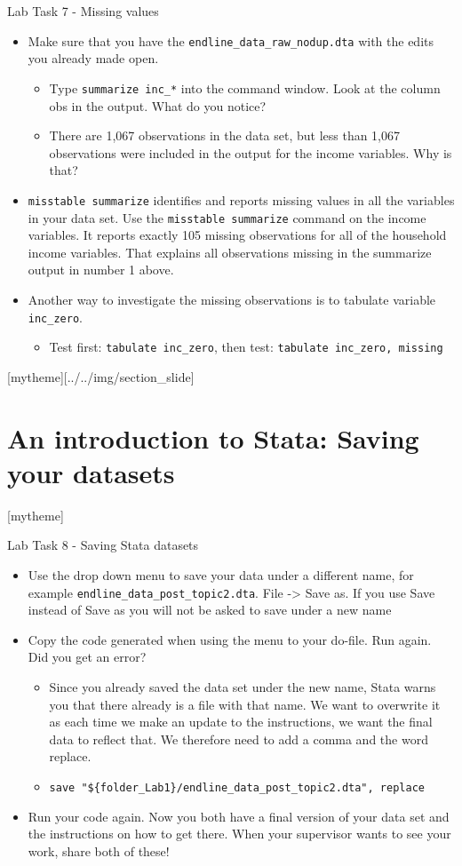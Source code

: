 \documentclass[aspectratio=169]{beamer}
\newcommand{\sectionpic}[2]{
	\setbeamertemplate{section page}[mytheme][#2]
	\section{#1}
	\setbeamertemplate{section page}[mytheme]
}
\begin{document}
\begin{frame}{Lab Task 7 - Missing values}
	\begin{itemize}
		\item Make sure that you have the \texttt{endline\_data\_raw\_nodup.dta} with the edits you already made open.
		\begin{itemize}
			\item Type \texttt{summarize inc\_*} into the command window. Look at the column obs in the output. What do you notice?
			\item There are  1,067 observations in the data set, but less than 1,067 observations were included in the output for the income variables. Why is that?
		\end{itemize}
		\item \texttt{misstable summarize} identifies and reports missing values in all the variables in your data set. Use the \texttt{misstable summarize} command on the income variables. It reports exactly 105 missing observations for all of the household income variables. That explains all observations missing in the summarize output in number 1 above.
		\item Another way to investigate the missing observations is to tabulate variable \texttt{inc\_zero}.
		\begin{itemize}
			\item Test first: \texttt{tabulate inc\_zero}, then test: \texttt{tabulate inc\_zero, missing}
		\end{itemize}
	\end{itemize}
\end{frame}

\sectionpic{An introduction to Stata: \newline Saving your datasets}{../../img/section_slide}

\begin{frame}{Lab Task 8 - Saving Stata datasets}
	\begin{itemize}
		\item Use the drop down menu to save your data under a different name, for example \texttt{endline\_data\_post\_topic2.dta}. File -> Save as. If you use Save instead of Save as you will not be asked to save under a new name
		\item Copy the code generated when using the menu to your do-file. Run again. Did you get an error?
			\begin{itemize}
				\item Since you already saved the data set under the new name, Stata warns you that there already is a file with that name. We want to overwrite it as each time we make an update to the instructions, we want the final data to reflect that. We therefore need to add a comma and the word replace.
				\item \texttt{save "\$\{folder\_Lab1\}/endline\_data\_post\_topic2.dta", replace}
			\end{itemize}
		\item Run your code again. Now you both have a final version of your data set and the instructions on how to get there. When your supervisor wants to see your work, share both of these!
	\end{itemize}
\end{frame}
\end{document}

